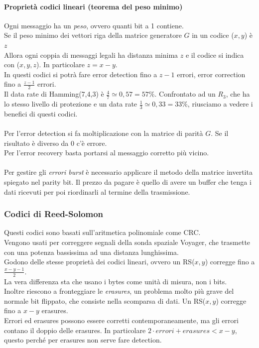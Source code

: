 \documentclass[10pt,a4paper,twoside]{article}
\begin{document}
\paragraph{Proprietà codici lineari (teorema del peso minimo)} Ogni messaggio ha un \textit{peso}, ovvero quanti bit a 1 contiene.\\
Se il peso minimo dei vettori riga della matrice generatore $G$ in un codice ($x,y$) è $z$\\
Allora ogni coppia di messaggi legali ha distanza minima $z$ e il codice si indica con ($x,y,z$). In particolare $z=x-y$.\\
In questi codici si potrà fare error detection fino a $z-1$ errori, error correction fino a $\frac{z-1}{2}$ errori.\\
Il data rate di Hamming(7,4,3) è $\frac{4}{7}\simeq 0,57=57\%$. Confrontato ad un $R_3$, che ha lo stesso livello di protezione e un data rate $\frac{1}{3}\simeq 0,33=33\%$, riusciamo a vedere i benefici di questi codici.\\\\
Per l'error detection si fa moltiplicazione con la matrice di parità $G$. Se il risultato è diverso da 0 c'è errore.\\
Per l'error recovery basta portarsi al messaggio corretto più vicino.\\\\
Per gestire gli \textit{errori burst} è necessario applicare il metodo della matrice invertita spiegato nel parity bit. Il prezzo da pagare è quello di avere un buffer che tenga i dati ricevuti per poi riordinarli al termine della trasmissione.

\subsubsection{Codici di Reed-Solomon}
Questi codici sono basati sull'aritmetica polinomiale come CRC.\\
Vengono usati per correggere segnali della sonda spaziale Voyager, che trasmette con una potenza bassissima ad una distanza lunghissima.\\
Godono delle stesse proprietà dei codici lineari, ovvero un RS($x,y$) corregge fino a $\frac{x-y-1}{2}$.\\
La vera differenza sta che usano i bytes come unità di misura, non i bits.\\
Inoltre riescono a fronteggiare le \textit{erasures}, un problema molto più grave del normale bit flippato, che consiste nella scomparsa di dati. Un RS($x,y$) corregge fino a $x-y$ erasures.\\
Errori ed erasures possono essere corretti contemporaneamente, ma gli errori contano il doppio delle erasures. In particolare $2\cdot errori+erasures<x-y$, questo perché per erasures non serve fare detection.
\end{document}
